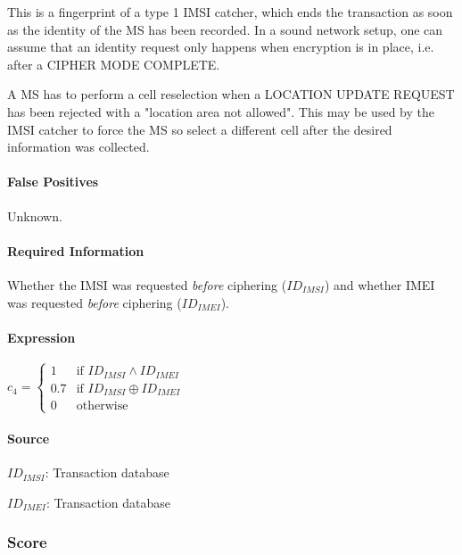 \documentclass[a4paper,11pt,notitlepage,bigheadings,oneside]{scrartcl}
\begin{document}
This is a fingerprint of a type 1 IMSI catcher, which ends the transaction as
soon as the identity of the MS has been recorded. In a sound network setup, one
can assume that an identity request only happens when encryption is in place,
i.e. after a CIPHER MODE COMPLETE.

A MS has to perform a cell reselection when a LOCATION UPDATE REQUEST has been
rejected with a "location area not allowed". This may be used by the IMSI
catcher to force the MS so select a different cell after the desired
information was collected.

\paragraph{False Positives}

Unknown.

\paragraph{Required Information}

Whether the IMSI was requested \emph{before} ciphering ($ID_{IMSI}$) and
whether IMEI was requested \emph{before} ciphering ($ID_{IMEI}$).


\paragraph{Expression}

$c_4 =
\begin{cases}
	1 	& \text{if } ID_{IMSI} \wedge ID_{IMEI} \\
	0.7     & \text{if } ID_{IMSI} \oplus ID_{IMEI} \\
	0       & \text{otherwise}
\end{cases}$

\paragraph{Source}

$ID_{IMSI}$: Transaction database


$ID_{IMEI}$: Transaction database


\subsubsection{Score}
\end{document}

